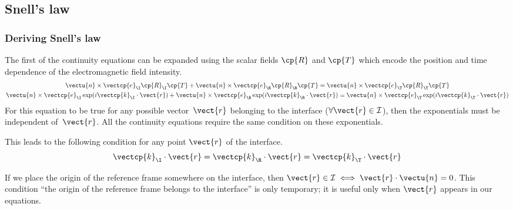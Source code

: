 \begin{refsection}
\subsection{Snell's law}
\label{sec:snells_law}

\subsubsection{Deriving Snell's law}
The first of the continuity equations can be expanded using the scalar fields $\cp{R}$ and $\cp{T}$ which encode the position and time dependence of the electromagnetic field intensity.
\begin{subequations}
    \begin{gather}
        \vectu{n} \times \vectcp{e}_\I \cp{R}_\I \cp{T} +
        \vectu{n} \times \vectcp{e}_\R \cp{R}_\R \cp{T}=
        \vectu{n} \times \vectcp{e}_\T \cp{R}_\T \cp{T}
        \\
        \vectu{n} \times \vectcp{e}_\I \exp(i \vectcp{k}_\I \cdot \vect{r}) +
        \vectu{n} \times \vectcp{e}_\R \exp(i \vectcp{k}_\R \cdot \vect{r}) =
        \vectu{n} \times \vectcp{e}_\T \exp(i \vectcp{k}_\T \cdot \vect{r})
    \end{gather}
\end{subequations}
For this equation to be true for any possible vector~$\vect{r}$ belonging to the interface
($\forall \vect{r} \in \mathcal{I}$), then the exponentials must be independent of~$\vect{r}$.
All the continuity equations require the same condition on these exponentials.

This leads to the following condition for any point $\vect{r}$ of the interface.
\begin{equation}
    \vectcp{k}_\I \cdot \vect{r} =
    \vectcp{k}_\R \cdot \vect{r} =
    \vectcp{k}_\T \cdot \vect{r}
\end{equation}

If we place the origin of the reference frame somewhere on the interface,
then $\vect{r} \in \mathcal{I} \iff \vect{r} \cdot \vectu{n}=0$.
This condition ``the origin of the reference frame belongs to the interface'' is only temporary; it is useful only when $\vect{r}$ appears in our equations.


\end{refsection}
